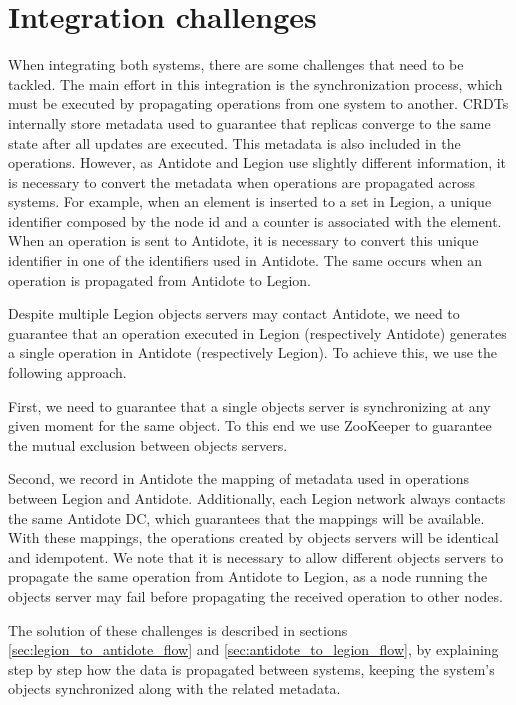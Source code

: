 \section{Integration challenges}
\label{sec:integration_challenges}
When integrating both systems, there are some challenges that need to be tackled. The main effort in this integration is the synchronization process, which must be executed by propagating operations from one system to another. CRDTs internally store metadata used to guarantee that replicas converge to the same state after all updates are executed. This metadata is also included in the operations. However, as Antidote and Legion use slightly different information, it is necessary to convert the metadata when operations are propagated across systems. For example, when an element is inserted to a set in Legion, a unique identifier composed by the node id and a counter is associated with the element. When an operation is sent to Antidote, it is necessary to convert this unique identifier in one of the identifiers used in Antidote. The same occurs when an operation is propagated from Antidote to Legion.\par
	Despite multiple Legion objects servers may contact Antidote, we need to guarantee that an operation executed in Legion (respectively Antidote) generates a single operation in Antidote (respectively Legion). To achieve this, we use the following approach.\par
	First, we need to guarantee that a single objects server is synchronizing at any given moment for the same object. To this end we use ZooKeeper to guarantee the mutual exclusion between objects servers.\par
	Second, we record in Antidote the mapping of metadata used in operations between Legion and Antidote. Additionally, each Legion network always contacts the same Antidote DC, which guarantees that the mappings will be available. With these mappings, the operations created by objects servers will be identical and idempotent. We note that it is necessary to allow different objects servers to propagate the same operation from Antidote to Legion, as a node running the objects server may fail before propagating the received operation to other nodes.\par
	The solution of these challenges is described in sections \ref{sec:legion_to_antidote_flow} and \ref{sec:antidote_to_legion_flow}, by explaining step by step how the data is propagated between systems, keeping the system's objects synchronized along with the related metadata.

